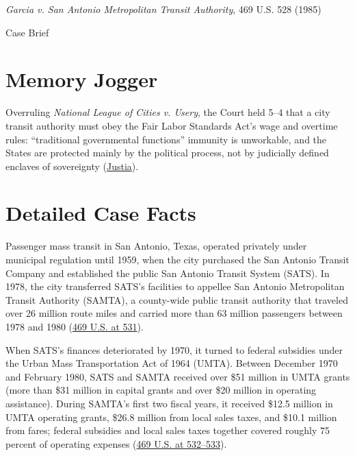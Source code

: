 \documentclass[12pt]{article}
\begin{document}
\begin{center}
{\LARGE \textit{Garcia v. San Antonio Metropolitan Transit Authority}, 469 U.S. 528 (1985)\par}
\vspace{0.8em}
{\large Case Brief\par}
\end{center}
\vspace{1em}

\section{Memory Jogger}
Overruling \textit{National League of Cities v. Usery}, the Court held 5--4 that a city transit authority must obey the Fair Labor Standards Act's wage and overtime rules: ``traditional governmental functions'' immunity is unworkable, and the States are protected mainly by the political process, not by judicially defined enclaves of sovereignty (\href{https://supreme.justia.com/cases/federal/us/469/528/}{Justia}).

\section{Detailed Case Facts}
Passenger mass transit in San Antonio, Texas, operated privately under municipal regulation until 1959, when the city purchased the San Antonio Transit Company and established the public San Antonio Transit System (SATS). In 1978, the city transferred SATS's facilities to appellee San Antonio Metropolitan Transit Authority (SAMTA), a county-wide public transit authority that traveled over 26 million route miles and carried more than 63 million passengers between 1978 and 1980 (\href{https://supreme.justia.com/cases/federal/us/469/528/}{469 U.S. at 531}).

When SATS's finances deteriorated by 1970, it turned to federal subsidies under the Urban Mass Transportation Act of 1964 (UMTA). Between December 1970 and February 1980, SATS and SAMTA received over \$51 million in UMTA grants (more than \$31 million in capital grants and over \$20 million in operating assistance). During SAMTA's first two fiscal years, it received \$12.5 million in UMTA operating grants, \$26.8 million from local sales taxes, and \$10.1 million from fares; federal subsidies and local sales taxes together covered roughly 75 percent of operating expenses (\href{https://supreme.justia.com/cases/federal/us/469/528/}{469 U.S. at 532--533}).
\end{document}
